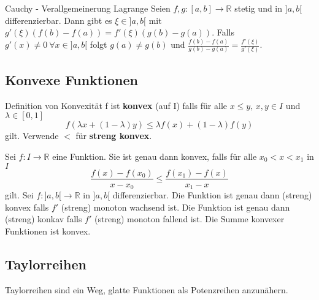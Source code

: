 \documentclass[a4paper,10pt]{article}
\def\R{\mathbb{R}}
\begin{document}
\begin{subbox}{Cauchy - Verallgemeinerung Lagrange}
  Seien $f, g: [a, b] \to \mathbb{R}$ stetig und in $]a, b[$ differenzierbar. Dann gibt es $\xi \in ]a, b[$ mit $g'(\xi)(f(b) - f(a)) = f'(\xi)(g(b) - g(a))$. Falls $g'(x) \neq 0 \ \forall x \in ]a, b[$ folgt $g(a) \neq g(b)$ und $\frac{f(b)-f(a)}{g(b)-g(a)} = \frac{f'(\xi)}{g'(\xi)}$.
\end{subbox}

\subsection{Konvexe Funktionen}
\begin{mainbox}{Definition von Konvexität}
  f ist \textbf{konvex} (auf I) falls für alle $x \leq y,\, x,y\in I$ und $\lambda \in [0,1]$ \[f(\lambda x + (1-\lambda)y) \leq \lambda f(x) + (1-\lambda)f(y)\] gilt. Verwende $<$ für \textbf{streng konvex}.
\end{mainbox}
Sei $f: I \to \R$ eine Funktion. Sie ist genau dann konvex, falls für alle $x_0 < x < x_1$ in $I$ \[\frac{f(x)-f(x_0)}{x-x_0}\leq \frac{f(x_1)-f(x)}{x_1-x}\] gilt. Sei $f:]a,b[ \to \R$ in $]a,b[$ differenzierbar. Die Funktion ist genau dann (streng) konvex falls $f'$ (streng) monoton wachsend ist. Die Funktion ist genau dann (streng) konkav falls $f'$ (streng) monoton fallend ist. Die Summe konvexer Funktionen ist konvex.

\subsection{Taylorreihen}
Taylorreihen sind ein Weg, glatte Funktionen als Potenzreihen anzunähern.
\end{document}
